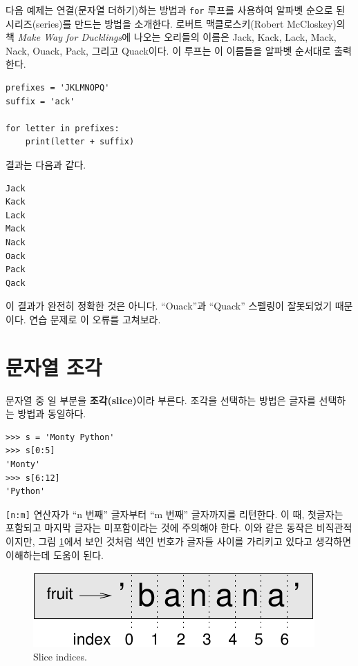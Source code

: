 \documentclass[10pt]{book}
\begin{document}

다음 예제는 연결(문자열 더하기)하는 방법과 {\tt for} 루프를 사용하여
알파벳 순으로 된 시리즈(series)를 만드는 방법을 소개한다.  로버트
맥클로스키(Robert McCloskey)의 책 {\em Make Way for Ducklings}에 나오는
오리들의 이름은 Jack, Kack, Lack, Mack, Nack, Ouack, Pack, 그리고
Quack이다.  이 루프는 이 이름들을 알파벳 순서대로 출력한다.


\begin{verbatim}
prefixes = 'JKLMNOPQ'
suffix = 'ack'

for letter in prefixes:
    print(letter + suffix)
\end{verbatim}
%
결과는 다음과 같다. 

\begin{verbatim}
Jack
Kack
Lack
Mack
Nack
Oack
Pack
Qack
\end{verbatim}
%
이 결과가 완전히 정확한 것은 아니다. ``Ouack''과 ``Quack'' 스펠링이
잘못되었기 때문이다.  연습 문제로 이 오류를 고쳐보라.




\section{문자열 조각}
\label{slice}
  
 

문자열 중 일 부분을 {\bf 조각(slice)}이라 부른다.  조각을 선택하는
방법은 글자를 선택하는 방법과 동일하다.


\begin{verbatim}
>>> s = 'Monty Python'
>>> s[0:5]
'Monty'
>>> s[6:12]
'Python'
\end{verbatim}
%
{\tt [n:m]} 연산자가 ``n 번째'' 글자부터 ``m 번째'' 글자까지를
리턴한다.  이 때, 첫글자는 포함되고 마지막 글자는 미포함이라는 것에
주의해야 한다.  이와 같은 동작은 비직관적이지만, 그림
\ref{fig.banana}에서 보인 것처럼 색인 번호가 글자들 사이를 가리키고
있다고 생각하면 이해하는데 도움이 된다.


\begin{figure}
\centerline
{\includegraphics[scale=0.8]{figs/banana.pdf}}
\caption{Slice indices.}
\label{fig.banana}
\end{figure}
\end{document}
